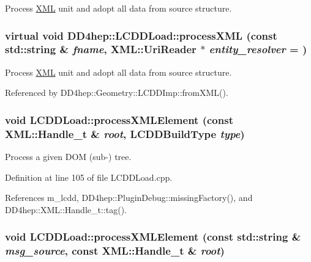 Process \hyperlink{namespace_d_d4hep_1_1_x_m_l}{XML} unit and adopt all data from source structure. \hypertarget{class_d_d4hep_1_1_l_c_d_d_load_ad66ecd500f706896d32c5dbd050292bb}{
\subsubsection[{processXML}]{\setlength{\rightskip}{0pt plus 5cm}virtual void DD4hep::LCDDLoad::processXML (const std::string \& {\em fname}, \/  {\bf XML::UriReader} $\ast$ {\em entity\_\-resolver} = {})}}
\label{class_d_d4hep_1_1_l_c_d_d_load_ad66ecd500f706896d32c5dbd050292bb}


Process \hyperlink{namespace_d_d4hep_1_1_x_m_l}{XML} unit and adopt all data from source structure. 

Referenced by DD4hep::Geometry::LCDDImp::fromXML().\hypertarget{class_d_d4hep_1_1_l_c_d_d_load_a6273870262bd0bd4102b546c1ef9d04d}{
\subsubsection[{processXMLElement}]{\setlength{\rightskip}{0pt plus 5cm}void LCDDLoad::processXMLElement (const {\bf XML::Handle\_\-t} \& {\em root}, \/  {\bf LCDDBuildType} {\em type})}}
\label{class_d_d4hep_1_1_l_c_d_d_load_a6273870262bd0bd4102b546c1ef9d04d}


Process a given DOM (sub-\/) tree. 

Definition at line 105 of file LCDDLoad.cpp.

References m\_\-lcdd, DD4hep::PluginDebug::missingFactory(), and DD4hep::XML::Handle\_\-t::tag().\hypertarget{class_d_d4hep_1_1_l_c_d_d_load_a4f51d1a8f1e4c726371a0553d3478430}{
\subsubsection[{processXMLElement}]{\setlength{\rightskip}{0pt plus 5cm}void LCDDLoad::processXMLElement (const std::string \& {\em msg\_\-source}, \/  const {\bf XML::Handle\_\-t} \& {\em root})}}
\label{class_d_d4hep_1_1_l_c_d_d_load_a4f51d1a8f1e4c726371a0553d3478430}


